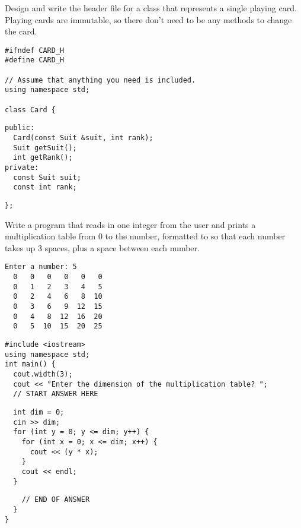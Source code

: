 \documentclass[11pt,answers]{exam}
\begin{document}
\begin{questions}
\question[20] Design and write the header file for a class that represents a single playing card. Playing cards are immutable, so there don't need to be any methods to change the card.
\begin{verbatim}
#ifndef CARD_H
#define CARD_H

// Assume that anything you need is included.
using namespace std;

class Card {
\end{verbatim}

\begin{solution}[4.5in]
\begin{verbatim}
public:
  Card(const Suit &suit, int rank);
  Suit getSuit();
  int getRank();
private:
  const Suit suit;
  const int rank;
\end{verbatim}
\end{solution}

\begin{verbatim}
};
\end{verbatim}

\newpage

\question[20] Write a program that reads in one integer from the user and prints a multiplication table from 0 to the number, formatted to so that each number takes up 3 spaces, plus a space between each number. \newline
\begin{verbatim}
Enter a number: 5
  0   0   0   0   0   0 
  0   1   2   3   4   5 
  0   2   4   6   8  10 
  0   3   6   9  12  15 
  0   4   8  12  16  20 
  0   5  10  15  20  25
\end{verbatim}

\begin{verbatim}
#include <iostream>
using namespace std;
int main() {
  cout.width(3);
  cout << "Enter the dimension of the multiplication table? "; 
  // START ANSWER HERE
\end{verbatim}

\begin{solution}[4.5in]
\begin{verbatim}
  int dim = 0;
  cin >> dim;
  for (int y = 0; y <= dim; y++) {
    for (int x = 0; x <= dim; x++) {
      cout << (y * x);
    }
    cout << endl;
  }
\end{verbatim}
\end{solution}

\begin{verbatim}
    // END OF ANSWER
  }
}
\end{verbatim}


\end{questions}
\end{document}
